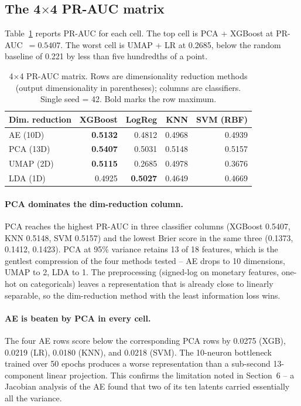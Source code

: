 \documentclass[12pt,a4paper]{article}
\begin{document}
\subsection{The 4$\times$4 PR-AUC matrix}

Table~\ref{tab:matrix_pr_auc} reports PR-AUC for each cell. The top cell is
PCA + XGBoost at PR-AUC~$= 0.5407$. The worst cell is UMAP + LR at 0.2685,
below the random baseline of 0.221 by less than five hundredths of a point.

\begin{table}[H]
\centering
\caption{4$\times$4 PR-AUC matrix. Rows are dimensionality reduction methods
         (output dimensionality in parentheses); columns are classifiers.
         Single seed = 42. Bold marks the row maximum.}
\label{tab:matrix_pr_auc}
\small
\begin{tabular}{lrrrr}
\toprule
Dim. reduction & XGBoost & LogReg & KNN & SVM (RBF) \\
\midrule
AE (10D)   & \textbf{0.5132} & 0.4812 & 0.4968 & 0.4939 \\
PCA (13D)  & \textbf{0.5407} & 0.5031 & 0.5148 & 0.5157 \\
UMAP (2D)  & \textbf{0.5115} & 0.2685 & 0.4978 & 0.3676 \\
LDA (1D)   & 0.4925 & \textbf{0.5027} & 0.4649 & 0.4669 \\
\bottomrule
\end{tabular}
\end{table}

\paragraph{PCA dominates the dim-reduction column.}
PCA reaches the highest PR-AUC in three classifier columns (XGBoost 0.5407,
KNN 0.5148, SVM 0.5157) and the lowest Brier score in the same three
(0.1373, 0.1412, 0.1423). PCA at 95\% variance retains 13 of 18 features,
which is the gentlest compression of the four methods tested -- AE drops to
10 dimensions, UMAP to 2, LDA to 1. The preprocessing (signed-log on
monetary features, one-hot on categoricals) leaves a representation that is
already close to linearly separable, so the dim-reduction method with the
least information loss wins.

\paragraph{AE is beaten by PCA in every cell.}
The four AE rows score below the corresponding PCA rows by 0.0275 (XGB),
0.0219 (LR), 0.0180 (KNN), and 0.0218 (SVM). The 10-neuron bottleneck
trained over 50 epochs produces a worse representation than a sub-second
13-component linear projection. This confirms the limitation noted in
Section~6 -- a Jacobian analysis of the AE found that two of its ten
latents carried essentially all the variance.
\end{document}
